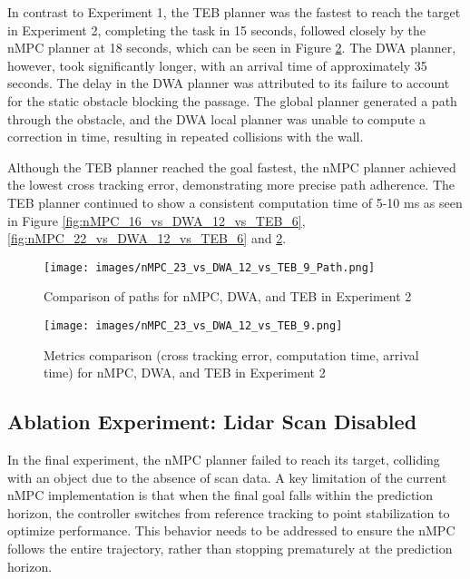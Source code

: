 \documentclass[conference]{IEEEtran}
\begin{document}
In contrast to Experiment 1, the TEB planner was the fastest to reach the target in Experiment 2, completing the task in 15 seconds, followed closely by the nMPC planner at 18 seconds, which can be seen in Figure \ref{fig:nMPC_23_vs_DWA_12_vs_TEB_6}. The DWA planner, however, took significantly longer, with an arrival time of approximately 35 seconds. The delay in the DWA planner was attributed to its failure to account for the static obstacle blocking the passage. The global planner generated a path through the obstacle, and the DWA local planner was unable to compute a correction in time, resulting in repeated collisions with the wall.

Although the TEB planner reached the goal fastest, the nMPC planner achieved the lowest cross tracking error, demonstrating more precise path adherence. The TEB planner continued to show a consistent computation time of 5-10 ms as seen in Figure \ref{fig:nMPC_16_vs_DWA_12_vs_TEB_6}, \ref{fig:nMPC_22_vs_DWA_12_vs_TEB_6} and \ref{fig:nMPC_23_vs_DWA_12_vs_TEB_6}.

\begin{figure}[!h]
    \centering
    \texttt{[image: images/nMPC\_23\_vs\_DWA\_12\_vs\_TEB\_9\_Path.png]}
    \caption{Comparison of paths for nMPC, DWA, and TEB in Experiment 2}
    \label{fig:nMPC_23_vs_DWA_12_vs_TEB_6_Path}
\end{figure}

\begin{figure}[!h]
    \centering
    \texttt{[image: images/nMPC\_23\_vs\_DWA\_12\_vs\_TEB\_9.png]}
    \caption{Metrics comparison (cross tracking error, computation time, arrival time) for nMPC, DWA, and TEB in Experiment 2}
    \label{fig:nMPC_23_vs_DWA_12_vs_TEB_6}
\end{figure}

\subsection{Ablation Experiment: Lidar Scan Disabled}

In the final experiment, the nMPC planner failed to reach its target, colliding with an object due to the absence of scan data. A key limitation of the current nMPC implementation is that when the final goal falls within the prediction horizon, the controller switches from reference tracking to point stabilization to optimize performance. This behavior needs to be addressed to ensure the nMPC follows the entire trajectory, rather than stopping prematurely at the prediction horizon.
\end{document}
